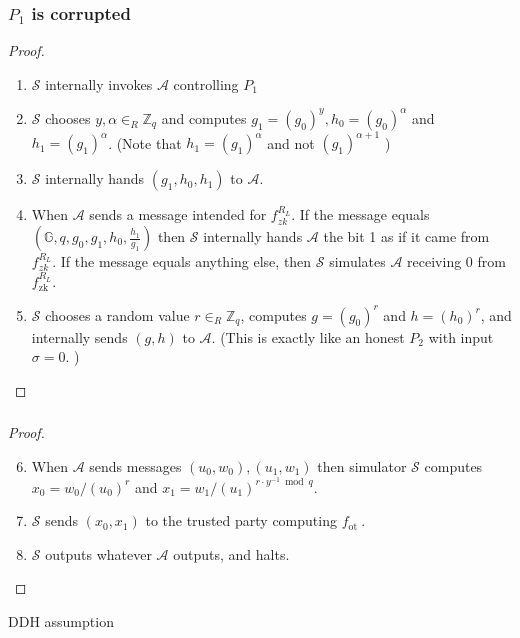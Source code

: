 \documentclass{beamer}
\begin{document}
    \begin{frame}
        \frametitle{$P_{1}$ is corrupted}
        \begin{proof}
            \begin{enumerate}
                \item  $\mathcal{S}$ internally invokes $\mathcal{A}$ controlling $P_{1}$
                \item $\mathcal{S}$ chooses $y, \alpha \in_{R} \mathbb{Z}_{q}$ and computes $g_{1}=\left(g_{0}\right)^{y}, h_{0}=\left(g_{0}\right)^{\alpha}$ and $h_{1}=\left(g_{1}\right)^{\alpha}$. (Note that $h_{1}=\left(g_{1}\right)^{\alpha}$ and not $\left(g_{1}\right)^{\alpha+1}$ )
                \item $\mathcal{S}$ internally hands $\left(g_{1}, h_{0}, h_{1}\right)$ to $\mathcal{A}$.
                \item When $\mathcal{A}$ sends a message intended for $f_{z k}^{R_{L}}$. If the message equals $\left(\mathbb{G}, q, g_{0}, g_{1}, h_{0}, \frac{h_{1}}{g_{1}}\right)$ then $\mathcal{S}$ internally hands $\mathcal{A}$ the bit 1 as if it came from $f_{z k}^{R_{L}} .$ If the message equals anything else, then $\mathcal{S}$ simulates $\mathcal{A}$ receiving 0 from $f_{\mathrm{zk}}^{R_{L}}$.
                \item  $\mathcal{S}$ chooses a random value $r \in_{R} \mathbb{Z}_{q}$, computes $g=\left(g_{0}\right)^{r}$ and $h=\left(h_{0}\right)^{r}$, and internally sends $(g, h)$ to $\mathcal{A}$. (This is exactly like an honest $P_{2}$ with input $\sigma=0 .$ )

            \end{enumerate}
        \end{proof}
    
        
    
    \end{frame}

    \begin{frame}
        \frametitle{}
        \begin{proof}
            \begin{enumerate}
                \setcounter{enumi}{5}
                \item When $\mathcal{A}$ sends messages $\left(u_{0}, w_{0}\right),\left(u_{1}, w_{1}\right)$ then simulator $\mathcal{S}$ computes $x_{0}=w_{0} /\left(u_{0}\right)^{r}$ and $x_{1}=w_{1} /\left(u_{1}\right)^{r \cdot y^{-1} \bmod q}$. 
                \item $\mathcal{S}$ sends $\left(x_{0}, x_{1}\right)$ to the trusted party computing $f_{\text {ot }}$. 
                \item $\mathcal{S}$ outputs whatever $\mathcal{A}$ outputs, and halts.
            \end{enumerate}
        \end{proof}

        DDH assumption
        
    
    \end{frame}
\end{document}
